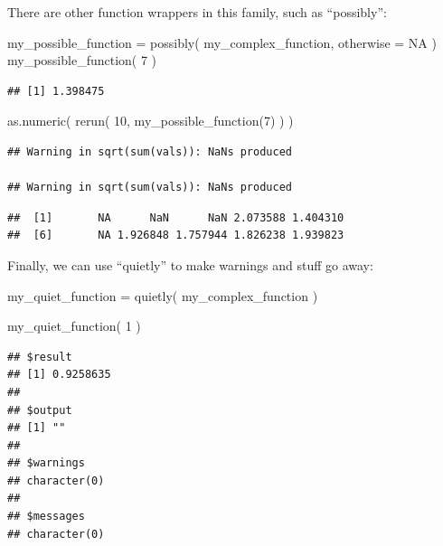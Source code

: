 \documentclass[
]{book}
\newenvironment{Shaded}{\begin{snugshade}}{\end{snugshade}}
\newcommand{\AttributeTok}[1]{\textcolor[rgb]{0.77,0.63,0.00}{#1}}
\newcommand{\ConstantTok}[1]{\textcolor[rgb]{0.00,0.00,0.00}{#1}}
\newcommand{\DecValTok}[1]{\textcolor[rgb]{0.00,0.00,0.81}{#1}}
\newcommand{\FunctionTok}[1]{\textcolor[rgb]{0.00,0.00,0.00}{#1}}
\newcommand{\NormalTok}[1]{#1}
\newcommand{\OtherTok}[1]{\textcolor[rgb]{0.56,0.35,0.01}{#1}}
\begin{document}
There are other function wrappers in this family, such as ``possibly'':

\begin{Shaded}
\begin{Highlighting}[]
\NormalTok{my\_possible\_function }\OtherTok{=} \FunctionTok{possibly}\NormalTok{( my\_complex\_function, }
                                 \AttributeTok{otherwise =} \ConstantTok{NA}\NormalTok{ )}
\FunctionTok{my\_possible\_function}\NormalTok{( }\DecValTok{7}\NormalTok{ )}
\end{Highlighting}
\end{Shaded}

\begin{verbatim}
## [1] 1.398475
\end{verbatim}

\begin{Shaded}
\begin{Highlighting}[]
\FunctionTok{as.numeric}\NormalTok{( }\FunctionTok{rerun}\NormalTok{( }\DecValTok{10}\NormalTok{, }\FunctionTok{my\_possible\_function}\NormalTok{(}\DecValTok{7}\NormalTok{) ) )}
\end{Highlighting}
\end{Shaded}

\begin{verbatim}
## Warning in sqrt(sum(vals)): NaNs produced

## Warning in sqrt(sum(vals)): NaNs produced
\end{verbatim}

\begin{verbatim}
##  [1]       NA      NaN      NaN 2.073588 1.404310
##  [6]       NA 1.926848 1.757944 1.826238 1.939823
\end{verbatim}

Finally, we can use ``quietly'' to make warnings and stuff go away:

\begin{Shaded}
\begin{Highlighting}[]
\NormalTok{my\_quiet\_function }\OtherTok{=} \FunctionTok{quietly}\NormalTok{( my\_complex\_function )}

\FunctionTok{my\_quiet\_function}\NormalTok{( }\DecValTok{1}\NormalTok{ )}
\end{Highlighting}
\end{Shaded}

\begin{verbatim}
## $result
## [1] 0.9258635
## 
## $output
## [1] ""
## 
## $warnings
## character(0)
## 
## $messages
## character(0)
\end{verbatim}
\end{document}
